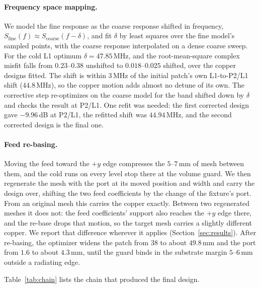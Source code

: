 \documentclass{anvil-paper}
\newcommand{\PL}{P2/L1}
\begin{document}
\paragraph{Frequency space mapping.}
We model the fine response as the coarse response shifted in frequency,
$S_{\mathrm{fine}}(f) \approx S_{\mathrm{coarse}}(f - \delta)$, and fit
$\delta$ by least squares over the fine model's sampled points, with the
coarse response interpolated on a dense coarse sweep. For the cold L1
optimum $\delta = 47.85$\,MHz, and the root-mean-square complex misfit
falls from $0.23$--$0.38$ unshifted to $0.018$--$0.025$ shifted, over the
copper designs fitted. The shift is within $3$\,MHz of the initial patch's
own L1-to-\PL{} shift ($44.8$\,MHz), so the copper motion adds almost no
detune of its own. The corrective step re-optimizes on the coarse model
for the band shifted down by $\delta$ and checks the result at \PL. One
refit was needed: the first corrected design gave $-9.96$\,dB at \PL, the
refitted shift was $44.94$\,MHz, and the second corrected design is the
final one.

\paragraph{Feed re-basing.}
Moving the feed toward the $+y$ edge compresses the $5$--$7$\,mm of mesh
between them, and the cold runs on every level stop there at the volume
guard. We then regenerate the mesh with the port at its moved position and
width and carry the design over, shifting the two feed coefficients by the
change of the fixture's port. From an original mesh this carries the
copper exactly. Between two regenerated meshes it does not: the feed
coefficients' support also reaches the $+y$ edge there, and the re-base
drops that motion, so the target mesh carries a slightly different copper.
We report that difference wherever it applies (Section~\ref{sec:results}).
After re-basing, the optimizer widens the patch from $38$ to about
$49.8$\,mm and the port from $1.6$ to about $4.3$\,mm, until the guard binds
in the substrate margin $5$--$6$\,mm outside a radiating edge.

Table~\ref{tab:chain} lists the chain that produced the final design.
\end{document}
